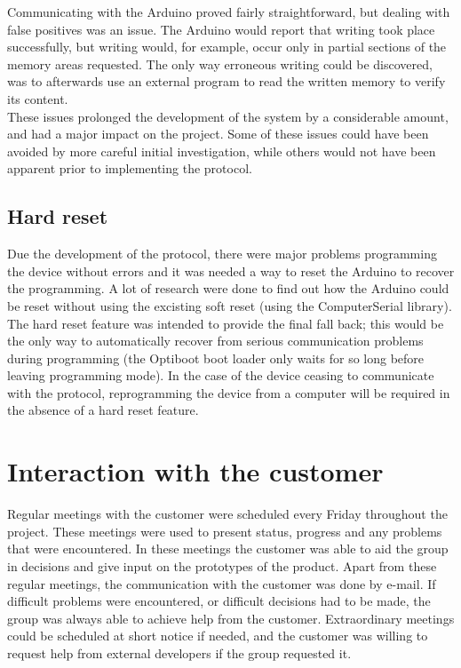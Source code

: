 	Communicating with the Arduino proved fairly straightforward, but dealing with false positives was an issue. The Arduino would report that writing took place successfully, but writing would, for example, occur only in partial sections of the memory areas requested. The only way erroneous writing could be discovered, was to afterwards use an external program to read the written memory to verify its content. \\

	These issues prolonged the development of the system by a considerable amount, and had a major impact on the project. Some of these issues could have been avoided by more careful initial investigation, while others would not have been apparent prior to implementing the protocol.

	\subsection{Hard reset}
	\label{hard-reset}
	Due the development of the protocol, there were major problems programming the device without errors and it was needed a way to reset the Arduino to recover the programming. A lot of research were done to find out how the Arduino could be reset without using the excisting soft reset (using the ComputerSerial library).\\
	
	The hard reset feature was intended to provide the final fall back; this would be the only way to automatically recover from serious communication problems during programming (the Optiboot boot loader only waits for so long before leaving programming mode). In the case of the device ceasing to communicate with the protocol, reprogramming the device from a computer will be required in the absence of a hard reset feature.\\
	

\section{Interaction with the customer}
	Regular meetings with the customer were scheduled every Friday throughout the project. These meetings were used to present status, progress and any problems that were encountered. In these meetings the customer was able to aid the group in decisions and give input on the prototypes of the product. Apart from these regular meetings, the communication with the customer was done by e-mail. If difficult problems were encountered, or difficult decisions had to be made, the group was always able to achieve help from the customer. Extraordinary meetings could be scheduled at short notice if needed, and the customer was willing to request help from external developers if the group requested it.

